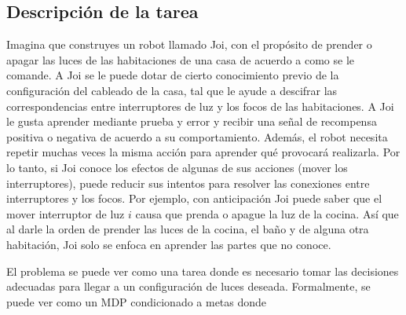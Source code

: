\subsection{Descripción de la tarea}\label{section:switches-example}

Imagina que construyes un robot llamado Joi, con el propósito de prender o apagar las luces de las habitaciones 
de una casa de acuerdo a como se le comande.
A Joi se le puede dotar de cierto conocimiento previo de la configuración
del cableado de la casa, tal que le ayude a descifrar las correspondencias entre
interruptores de luz y los focos de las habitaciones. 
 A Joi le gusta aprender mediante prueba
 y error y recibir una señal de recompensa positiva o negativa de acuerdo a su comportamiento. Además, el robot 
 necesita repetir muchas veces la misma acción para aprender
 qué provocará realizarla. Por lo tanto, si Joi conoce los efectos de algunas de sus acciones (mover los interruptores), puede reducir sus intentos para
 resolver las conexiones entre interruptores y los focos. 
 Por ejemplo, con anticipación Joi puede saber que el mover interruptor de luz $i$ causa que
prenda o apague la luz de la cocina.
 Así que al darle la orden de prender las luces de la cocina, el baño y de alguna otra habitación, Joi solo se enfoca en aprender las partes que no
 conoce.
 
 El problema se puede ver como una tarea donde es necesario tomar las
 decisiones adecuadas para llegar a un configuración de luces deseada. Formalmente, se puede ver como un MDP condicionado a metas donde 
 
